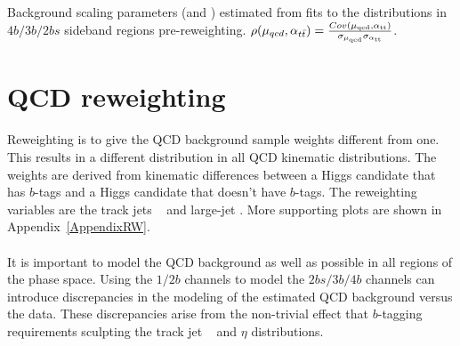 \begin{table}[htbp!]
\begin{center}
\caption{Background scaling parameters (\muqcd and \alphatt) estimated from fits to the \mleadJ distributions in $4b/3b/2bs$ sideband regions pre-reweighting. $\rho(\mu_{qcd},\alpha_{t\bar{t}}) = \frac{Cov(\rm \mu_{qcd},\rm \alpha_{\rm tt})}{\rm \sigma_{\mu_{qcd}} \rm \sigma_{\rm \alpha_{ tt}} }$.}

\label{tab:bkgfit_prereweight}
\end{center}
\end{table}



\section{QCD reweighting}
\label{sec:boosted-reweight}

\paragraph{}
Reweighting is to give the QCD background sample weights different from one.
This results in a different distribution in all QCD kinematic distributions.
The weights are derived from kinematic differences between a Higgs candidate that has $b$-tags and a Higgs candidate that doesn't have $b$-tags.
The reweighting variables are the track jets \pt~ and large-\R jet \pt.
More supporting plots are shown in Appendix~\ref{AppendixRW}.

\paragraph{}
It is important to model the QCD background as well as possible in all regions of the phase space.
Using the $1/2b$ channels to model the $2bs/3b/4b$ channels can introduce discrepancies in the modeling of the estimated QCD background versus the data. 
These discrepancies arise from the non-trivial effect that $b$-tagging requirements sculpting the track jet \pt~ and $\eta$ distributions.

